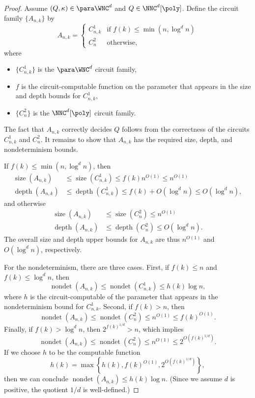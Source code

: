 \documentclass{article}
\DeclareMathOperator{\depth}{depth}
\DeclareMathOperator{\nondet}{nondet}
\DeclareMathOperator{\size}{size}
\begin{document}
\begin{proof}
  Assume $(Q, \kappa) \in \para \WNC^d$ and $Q \in \NNC^d[\poly]$.
  Define the circuit family $\{A_{n, k}\}$ by
  \[
  A_{n, k} =
  \begin{cases}
    C^1_{n, k} & \text{if } f(k) \leq \min(n, \log^d n) \\
    C^2_n & \text{otherwise},
  \end{cases}
  \]
  where
  \begin{itemize}
  \item $\{C^1_{n, k}\}$ is the $\para \WNC^d$ circuit family,
  \item $f$ is the circuit-computable function on the parameter that appears in the size and depth bounds for $C^1_{n, k}$,
  \item $\{C^2_n\}$ is the $\NNC^d[\poly]$ circuit family.
  \end{itemize}
  The fact that $A_{n, k}$ correctly decides $Q$ follows from the correctness of the circuits $C^1_{n, k}$ and $C^2_n$.
  It remains to show that $A_{n, k}$ has the required size, depth, and nondeterminism bounds.

  If $f(k) \leq \min(n, \log^d n)$, then
  \begin{align*}
    \size(A_{n, k}) & \leq \size(C^1_{n, k}) \leq f(k) n^{O(1)} \leq n^{O(1)} \\
    \depth(A_{n, k}) & \leq \depth(C^1_{n, k}) \leq f(k) + O(\log^d n) \leq O(\log^d n),
  \end{align*}
  and otherwise
  \begin{align*}
    \size(A_{n, k}) & \leq \size(C^2_n) \leq n^{O(1)} \\
    \depth(A_{n, k}) & \leq \depth(C^2_n) \leq O(\log^d n).
  \end{align*}
  The overall size and depth upper bounds for $A_{n, k}$ are thus $n^{O(1)}$ and $O(\log^d n)$, respectively.

  For the nondeterminism, there are three cases.
  First, if $f(k) \leq n$ and $f(k) \leq \log^d n$, then
  \[
  \nondet(A_{n, k}) \leq \nondet(C^1_{n, k}) \leq h(k) \log n,
  \]
  where $h$ is the circuit-computable of the parameter that appears in the nondeterminism bound for $C^1_{n, k}$.
  Second, if $f(k) > n$, then
  \[
  \nondet(A_{n, k}) \leq \nondet(C^2_n) \leq n^{O(1)} \leq f(k)^{O(1)}.
  \]
  Finally, if $f(k) > \log^d n$, then $2^{f(k)^{1 / d}} > n$, which implies
  \[
  \nondet(A_{n, k}) \leq \nondet(C^2_n) \leq n^{O(1)} \leq 2^{O\left(f(k)^{1 / d}\right)}.
  \]
  If we choose $h$ to be the computable function
  \[
  h(k) = \max \left\{ h(k), f(k)^{O(1)}, 2^{O\left(f(k)^{1 / d}\right)} \right\},
  \]
  then we can conclude $\nondet(A_{n, k}) \leq h(k) \log n$.
  (Since we assume $d$ is positive, the quotient $1 / d$ is well-defined.)
\end{proof}
\end{document}
